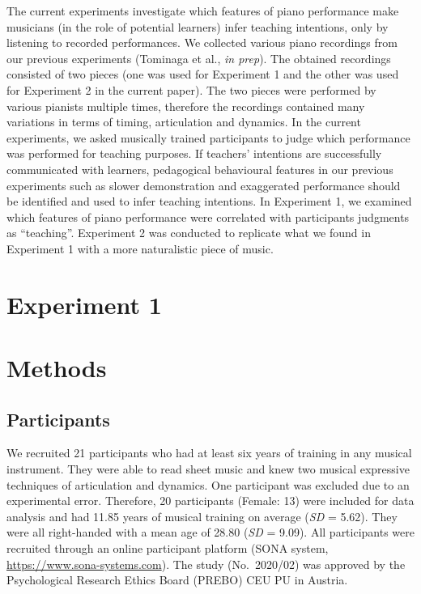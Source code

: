 \documentclass[
  man,floatsintext]{apa6}
\begin{document}
The current experiments investigate which features of piano performance make musicians (in the role of potential learners) infer teaching intentions, only by listening to recorded performances. We collected various piano recordings from our previous experiments (Tominaga et al., \emph{in prep}). The obtained recordings consisted of two pieces (one was used for Experiment 1 and the other was used for Experiment 2 in the current paper). The two pieces were performed by various pianists multiple times, therefore the recordings contained many variations in terms of timing, articulation and dynamics. In the current experiments, we asked musically trained participants to judge which performance was performed for teaching purposes. If teachers' intentions are successfully communicated with learners, pedagogical behavioural features in our previous experiments such as slower demonstration and exaggerated performance should be identified and used to infer teaching intentions. In Experiment 1, we examined which features of piano performance were correlated with participants judgments as ``teaching''. Experiment 2 was conducted to replicate what we found in Experiment 1 with a more naturalistic piece of music.

\hypertarget{experiment-1}{%
\section{Experiment 1}\label{experiment-1}}

\hypertarget{methods}{%
\section{Methods}\label{methods}}

\hypertarget{participants}{%
\subsection{Participants}\label{participants}}

We recruited 21 participants who had at least six years of training in any musical instrument. They were able to read sheet music and knew two musical expressive techniques of articulation and dynamics. One participant was excluded due to an experimental error. Therefore, 20 participants (Female: 13) were included for data analysis and had 11.85 years of musical training on average (\emph{SD} = 5.62). They were all right-handed with a mean age of 28.80 (\emph{SD} = 9.09). All participants were recruited through an online participant platform (SONA system, \url{https://www.sona-systems.com}). The study (No.~2020/02) was approved by the Psychological Research Ethics Board (PREBO) CEU PU in Austria.
\end{document}
